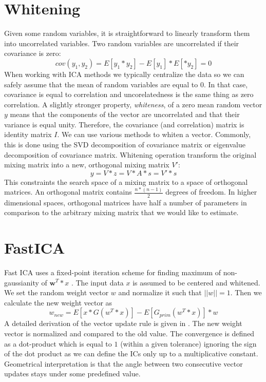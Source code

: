 \documentclass{article}
\begin{document}
\section{Whitening}
\label{ch:whitening}
Given some random variables, it is straightforward to linearly transform them into uncorrelated variables.
Two random variables are uncorrelated if their covariance is zero:
\begin{equation}
    cov(y_1, y_2) = E\left[y_1*y_2\right] - E\left[y_1\right] * E\left[*y_2\right] = 0
\end{equation}
When working with ICA methods we typically centralize the data so we can safely assume that the mean of
random variables are equal to $0$. In that case, covariance is equal to correlation and uncorelatedness is the same thing as zero correlation.
A slightly stronger property, \textit{whiteness}, of a zero mean random vector $y$ means that the components of the vector are uncorrelated and that their variance is equal unity. Therefore, the covariance (and correlation) matrix is identity matrix $I$. We can use various methods to whiten a vector.
Commonly, this is done using the SVD decomposition of covariance matrix or eigenvalue decomposition of covariance matrix. Whitening operation transform the original mixing matrix into a new, orthogonal mixing matrix $V'$:
\begin{equation}
    y = V * z = V * A * s = V' * s
\end{equation}
This constraints the search space of a mixing matrix to a space of orthogonal matrices. An orthogonal matrix contains $\frac{n * (n-1)}{2}$ degrees of freedom. In higher dimensional spaces, orthogonal matrices have half a number of parameters in comparison to the arbitrary mixing matrix that we would like
to estimate.

\section{FastICA}
Fast ICA  \cite{Hyvarinen1997} uses a fixed-point iteration scheme for finding maximum of non-gaussianity of $\textbf{w}^T * x$ \cite{Hyvarinen1997}.
The input data $x$ is assumed to be centered and whitened.
We set the random weight vector $w$ and normalize it such that $||w|| = 1$. Then we calculate the new
weight vector as
\begin{equation}
    w_{new} = E\left[x*G(w^T*x)\right] - E\left[G_{prim}(w^T*x)\right] * w
\end{equation}
A detailed derivation of the vector update rule is given in \cite{Hyvarinen2000}. The new weight vector is normalized and compared to the old value. The convergence is defined as a dot-product which is equal to $1$ (within a given tolerance) ignoring the sign of the dot product as we can define the ICs only up to a multiplicative constant. Geometrical interpretation is that the angle between two consecutive vector updates stays under some predefined value.
\end{document}
